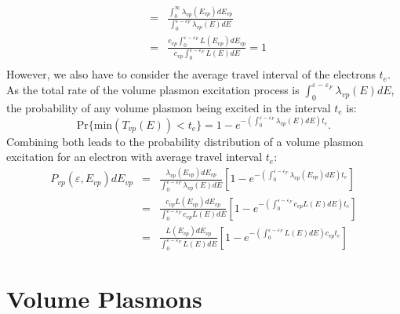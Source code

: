 \begin{refsection}
\begin{eqnarray*}
&=& \frac{\int_0^\infty \lambda_{vp}(E_{vp}) dE_{vp}}{\int_0^{\varepsilon - \varepsilon_F} \lambda_{vp}(E) dE} \\
&=& \frac{c_{vp} \int_0^{\varepsilon - \varepsilon_F} L(E_{vp}) dE_{vp}}{c_{vp} \int_0^{\varepsilon - \varepsilon_F} L(E) dE} = 1 \\
\end{eqnarray*}
However, we also have to consider the average travel interval of the electrons 
$t_e$. As the total rate of the volume plasmon excitation process is 
$\int_0^{\varepsilon - \varepsilon_F} \lambda_{vp}(E) dE$, the probability of 
any volume plasmon being excited in the interval $t_e$ is:
\begin{equation}
\text{Pr}\{\text{min}(T_{vp}(E)) < t_e \} = 1 - e^{-(\int_0^{\varepsilon - \varepsilon_F} \lambda_{vp}(E) dE) t_e}.
\end{equation}
Combining both leads to the probability distribution of a volume plasmon 
excitation for an electron with average travel interval $t_e$:
\begin{eqnarray}
P_{vp}(\varepsilon, E_{vp}) dE_{vp} &=& \frac{\lambda_{vp}(E_{vp})dE_{vp}}{\int_0^{\varepsilon - \varepsilon_F} \lambda_{vp}(E) dE }\left[1-e^{-\left(\int_0^{\varepsilon - \varepsilon_F} \lambda_{vp}(E_{vp}) dE\right) t_e }\right] \nonumber \\
&=& \frac{c_{vp} L(E_{vp})dE_{vp}}{\int_0^{\varepsilon - \varepsilon_F} c_{vp} L(E) dE }\left[1-e^{-\left(\int_0^{\varepsilon - \varepsilon_F} c_{vp} L(E) dE\right) t_e }\right] \nonumber \\
&=& \frac{L(E_{vp})dE_{vp}}{\int_0^{\varepsilon - \varepsilon_F} L(E) dE 
}\left[1-e^{-\left(\int_0^{\varepsilon - \varepsilon_F} L(E) dE\right) c_{vp} t_e 
}\right] \label{appendix:eq-vp_prob}
\end{eqnarray}
 
\section{Volume Plasmons} 
 

\end{refsection}
